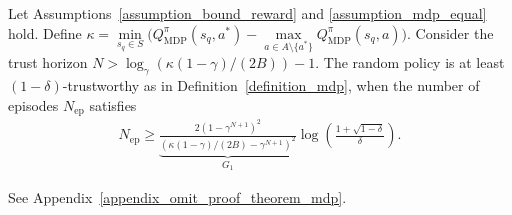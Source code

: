 \begin{theorem}[MDP]\label{theorem_mdp}
Let Assumptions~\ref{assumption_bound_reward} and \ref{assumption_mdp_equal} hold.
 Define $\kappa = \min\limits_{s_q \in S} \big( Q_\text{MDP}^\pi(s_q, a^*) - \max\limits_{a \in A \setminus \{a^*\}} Q_\text{MDP}^\pi(s_q, a) \big)$. Consider the trust horizon $N > \log_\gamma \left( \kappa (1-\gamma)/(2B) \right)-1$. The random policy is at least $(1-\delta)$-trustworthy as in Definition~\ref{definition_mdp}, when the number of episodes $N_\text{ep}$ satisfies
%
\begin{align}\label{eqn_theorem_MDP}
    N_\text{ep}  \geq \underbrace{ \frac{ 2 \left( 1-\gamma^{N+1}\right)^2}{ \left( \kappa \left( 1-\gamma \right) / (2B) - \gamma^{N+1}\right)^2} }_{G_1}   \log \left( \frac{1+\sqrt{1-\delta}}{\delta} \right).
\end{align}
\end{theorem}
%
%
\begin{myproof}
    See Appendix~\ref{appendix_omit_proof_theorem_mdp}.
\end{myproof}
%
%


